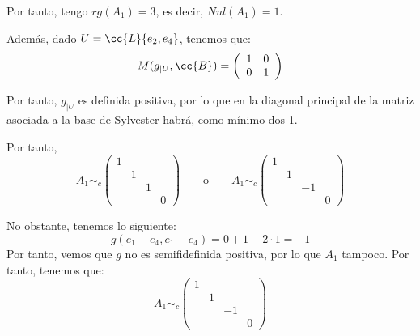 \begin{ejercicio}
\begin{enumerate}
\begin{enumerate}
            Por tanto, tengo $rg(A_1)=3$, es decir, $Nul(A_1) = 1$.

            Además, dado $U=\cc{L}\{e_2, e_4\}$, tenemos que:
            \begin{equation*}
                M(g_{|U}, \cc{B}) = \left( \begin{array}{cc}
                    1 & 0 \\
                    0 & 1 \\
                \end{array} \right)
            \end{equation*}

            Por tanto, $g_{|U}$ es definida positiva, por lo que en la diagonal principal de la matriz asociada a la base de Sylvester habrá, como mínimo dos 1.
        
            Por tanto,
            \begin{equation*}
                A_1 \sim_c \left( \begin{array}{cccc}
                1 &&& \\
                &1&& \\
                &&1&\\
                &&&0
            \end{array} \right)
            \qquad \text{o} \qquad
            A_1 \sim_c \left( \begin{array}{cccc}
                1 &&& \\
                &1&& \\
                &&-1&\\
                &&&0
            \end{array} \right)
            \end{equation*}

            No obstante, tenemos lo siguiente:
            \begin{equation*}
                g(e_1 - e_4, e_1 - e_4) = 0 + 1 -2\cdot 1 = -1
            \end{equation*}
            Por tanto, vemos que $g$ no es semifidefinida positiva, por lo que $A_1$ tampoco. Por tanto, tenemos que:
            \begin{equation*}
                A_1 \sim_c \left( \begin{array}{cccc}
                    1 &&& \\
                    &1&& \\
                    &&-1&\\
                    &&&0
                \end{array} \right)
            \end{equation*}




\end{enumerate}
\end{enumerate}
\end{ejercicio}
